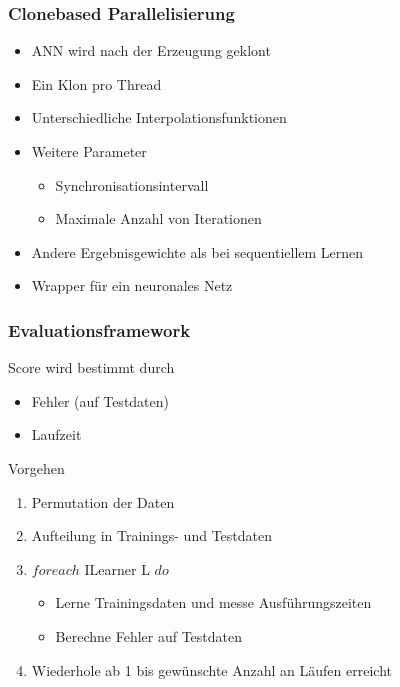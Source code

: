\documentclass[18pt]{beamer}
\begin{document}
	\begin{frame}\frametitle{Clonebased Parallelisierung}
		\begin{itemize}
			\item ANN wird nach der Erzeugung \glqq geklont\grqq
			\item Ein Klon pro Thread
			\item Unterschiedliche Interpolationsfunktionen
			\item Weitere Parameter
			\begin{itemize}
				\item Synchronisationsintervall
				\item Maximale Anzahl von Iterationen
			\end{itemize}				
			\item Andere Ergebnisgewichte als bei sequentiellem Lernen
			\item Wrapper für ein neuronales Netz
		\end{itemize}
	\end{frame}





	\begin{frame}\frametitle{Evaluationsframework}
		\begin{block}{Score}
			wird bestimmt durch
		    \begin{itemize}
		    	\item Fehler (auf Testdaten)
		    	\item Laufzeit
		    \end{itemize}
		\end{block}
		\begin{block}{Vorgehen}
		    \begin{enumerate}
		    	\item Permutation der Daten
		    	\item Aufteilung in Trainings- und Testdaten
				\item $foreach$ ILearner L $do$
				\begin{itemize}
					\item Lerne Trainingsdaten und messe Ausführungszeiten
					\item Berechne Fehler auf Testdaten
				\end{itemize}
				\item Wiederhole ab 1 bis gewünschte Anzahl an Läufen erreicht
		    \end{enumerate}
		\end{block}
	\end{frame}
	
\end{document}
